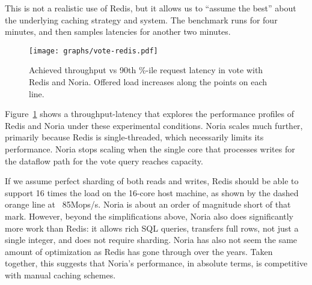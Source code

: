 This is not a realistic use of Redis, but it allows us to ``assume the best''
about the underlying caching strategy and system. The benchmark runs for four
minutes, and then samples latencies for another two minutes.

\begin{figure}[h]
  \centering
  \texttt{[image: graphs/vote-redis.pdf]}
  \caption{Achieved throughput vs 90th \%-ile request latency in vote with Redis
  and Noria. Offered load increases along the points on each line.}
  \label{f:vote-redis}
\end{figure}

Figure~\ref{f:vote-redis} shows a throughput-latency that explores the
performance profiles of Redis and Noria under these experimental conditions.
Noria scales much further, primarily because Redis is single-threaded, which
necessarily limits its performance. Noria stops scaling when the single core
that processes writes for the dataflow path for the vote query reaches capacity.

If we assume perfect sharding of both reads and writes, Redis should be able to
support 16 times the load on the 16-core host machine, as shown by the dashed
orange line at ~85Mops/s. Noria is about an order of magnitude short of that
mark. However, beyond the simplifications above, Noria also does significantly
more work than Redis: it allows rich SQL queries, transfers full rows, not just
a single integer, and does not require sharding. Noria has also not seem the
same amount of optimization as Redis has gone through over the years. Taken
together, this suggests that Noria's performance, in absolute terms, is
competitive with manual caching schemes.
